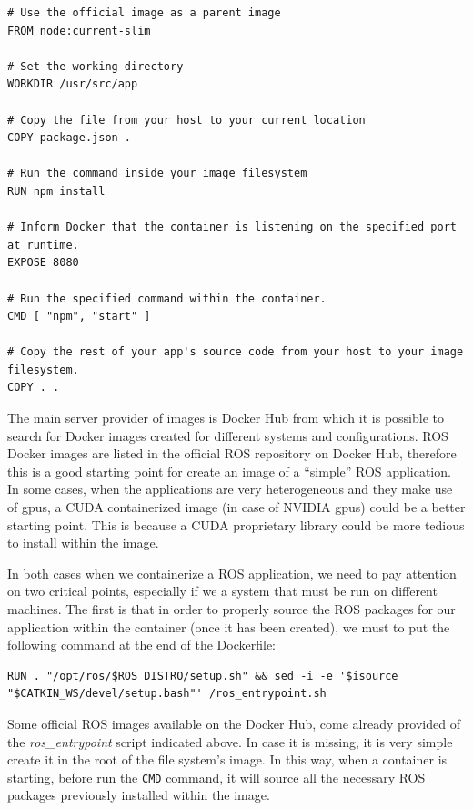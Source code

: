 \begin{verbatim}
# Use the official image as a parent image
FROM node:current-slim

# Set the working directory
WORKDIR /usr/src/app

# Copy the file from your host to your current location
COPY package.json .

# Run the command inside your image filesystem
RUN npm install

# Inform Docker that the container is listening on the specified port at runtime.
EXPOSE 8080

# Run the specified command within the container.
CMD [ "npm", "start" ]

# Copy the rest of your app's source code from your host to your image filesystem.
COPY . .
\end{verbatim}


The main server provider of images is Docker Hub \cite{DockerHub} from which it is possible to search for Docker images created for different systems and configurations.
ROS Docker images are listed in the official ROS repository on Docker Hub, therefore this is a good starting point for create an image of a ``simple'' ROS application.
In some cases, when the applications are very heterogeneous and they make use of gpus, a CUDA containerized image (in case of NVIDIA gpus) could be a better starting point.
This is because a CUDA proprietary library could be more tedious to install within the image.

In both cases when we containerize a ROS application, we need to pay attention on two critical points, especially if we a system that must be run on different machines.
The first is that in order to properly source the ROS packages for our application within the container (once it has been created), we must to put the following command at the end of the Dockerfile:

\begin{verbatim}
RUN . "/opt/ros/$ROS_DISTRO/setup.sh" && sed -i -e '$isource "$CATKIN_WS/devel/setup.bash"' /ros_entrypoint.sh
\end{verbatim}


Some official ROS images available on the Docker Hub, come already provided of the \textit{ros\_entrypoint} script indicated above. In case it is missing, it is very simple create it in the root of the file system's image. In this way, when a container is starting, before run the \texttt{CMD} command, it will source all the necessary ROS packages previously installed within the image.

